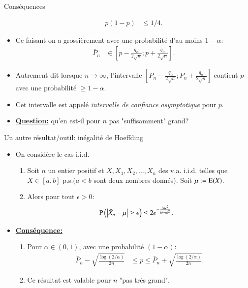 \begin{frame}[allowframebreaks]{Conséquences}
\begin{itemize}
\begin{align*}
            p(1-p)&\leq 1/4.
        \end{align*}
        \item Ce faisant on a grossièrement avec une probabilité d'au moins $1-\alpha$:\begin{align*}
            \bar{P}_n&\in\left[p - \frac{q_\alpha}{2\sqrt{n}};
             p + \frac{q_\alpha}{2\sqrt{n}}\right].
        \end{align*}
        \item Autrement dit lorsque $n\rightarrow \infty$, l'intervalle $\left[\bar{P}_n - \frac{q_\alpha}{2\sqrt{n}};
        \bar{P}_n + \frac{q_\alpha}{2\sqrt{n}}\right]$ contient $p$ avec une probabilité $\geq 1-\alpha$.
        \item Cet intervalle est appelé \emph{intervalle de confiance asymptotique} pour $p$.
        \item \textbf{\underline{Question:}} qu'en est-il pour $n$ pas "suffisamment" grand?
\end{itemize}
\end{frame}
\begin{frame}[allowframebreaks]{Un autre résultat/outil: inégalité de Hoeffding}
    \begin{itemize}
        \item On considère le cas i.i.d.
    \begin{enumerate}[-]
        \item Soit $n$ un entier positif et $X, X_1, X_2, \ldots, X_n$ des v.a. i.i.d. telles que 
        $X\in [a, b]$ p.s.($a<b$ sont deux nombres donnés). Soit $\mu :=\operatorname{E}(X)$. 
        \item Alors pour tout $\epsilon>0$:\begin{align*}
            \operatorname{P}\left(\left\vert {\bar{X}_n - \mu} \right\vert \geq \epsilon\right)&\leq 2e^{-\frac{2n\epsilon^2}{(b-a)^2}}.
        \end{align*}
\end{enumerate}
\item \textbf{\underline{Conséquence:}}\begin{enumerate}[-]
    \item Pour $\alpha \in (0, 1)$, avec une probabilité $(1-\alpha)$:\begin{align*}
        \bar{P}_n-\sqrt{\frac{\log(2/\alpha)}{2n}}&\leq p \leq \bar{P}_n+\sqrt{\frac{\log(2/\alpha)}{2n}}.
    \end{align*}
    \item Ce résultat est valable pour $n$ "pas très grand".
\end{enumerate}
\end{itemize}
\end{frame}
